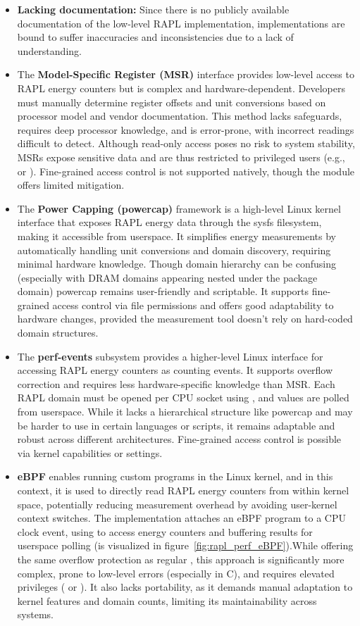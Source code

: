 \begin{itemize}
    \item \textbf{Lacking documentation: } Since there is no publicly available documentation of the low-level RAPL implementation, implementations are bound to suffer inaccuracies and inconsistencies due to a lack of understanding.
    \item The \textbf{Model-Specific Register (MSR)} interface provides low-level access to RAPL energy counters but is complex and hardware-dependent. Developers must manually determine register offsets and unit conversions based on processor model and vendor documentation. This method lacks safeguards, requires deep processor knowledge, and is error-prone, with incorrect readings difficult to detect. Although read-only access poses no risk to system stability, MSRs expose sensitive data and are thus restricted to privileged users (e.g.,  or ). Fine-grained access control is not supported natively, though the  module offers limited mitigation.
    \item The \textbf{Power Capping (powercap)} framework is a high-level Linux kernel interface that exposes RAPL energy data through the sysfs filesystem, making it accessible from userspace. It simplifies energy measurements by automatically handling unit conversions and domain discovery, requiring minimal hardware knowledge. Though domain hierarchy can be confusing (especially with DRAM domains appearing nested under the package domain) powercap remains user-friendly and scriptable. It supports fine-grained access control via file permissions and offers good adaptability to hardware changes, provided the measurement tool doesn't rely on hard-coded domain structures.
    \item The \textbf{perf-events} subsystem provides a higher-level Linux interface for accessing RAPL energy counters as counting events. It supports overflow correction and requires less hardware-specific knowledge than MSR. Each RAPL domain must be opened per CPU socket using , and values are polled from userspace. While it lacks a hierarchical structure like powercap and may be harder to use in certain languages or scripts, it remains adaptable and robust across different architectures. Fine-grained access control is possible via kernel capabilities or  settings. 
    \item \textbf{eBPF} enables running custom programs in the Linux kernel, and in this context, it is used to directly read RAPL energy counters from within kernel space, potentially reducing measurement overhead by avoiding user-kernel context switches. The implementation attaches an eBPF program to a CPU clock event, using  to access energy counters and buffering results for userspace polling (is visualized in figure~\ref{fig:rapl_perf_eBPF}).While offering the same overflow protection as regular , this approach is significantly more complex, prone to low-level errors (especially in C), and requires elevated privileges ( or ). It also lacks portability, as it demands manual adaptation to kernel features and domain counts, limiting its maintainability across systems.
\end{itemize}
